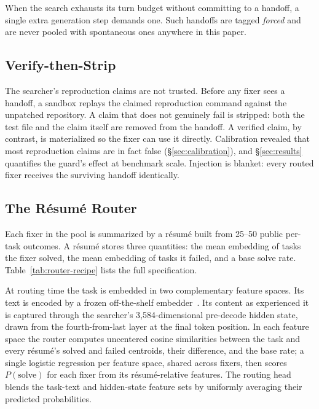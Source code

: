 When the search exhausts its turn budget without committing to a handoff, a
single extra generation step demands one.  Such handoffs are tagged
\emph{forced} and are never pooled with spontaneous ones anywhere in this paper.

\subsection{Verify-then-Strip}
\label{sec:verify-strip}

The searcher's reproduction claims are not trusted.  Before any fixer sees a
handoff, a sandbox replays the claimed reproduction command against the
unpatched repository.  A claim that does not genuinely fail is stripped: both
the test file and the claim itself are removed from the handoff.  A verified
claim, by contrast, is materialized so the fixer can use it directly.
Calibration revealed that most reproduction claims are in fact false
(\S\ref{sec:calibration}), and \S\ref{sec:results} quantifies the guard's
effect at benchmark scale.  Injection is blanket: every routed fixer receives
the surviving handoff identically.

\subsection{The R\'esum\'e Router}
\label{sec:router}

\begin{table}[!tbp]
\centering
\caption{\textbf{The r\'esum\'e router, end to end.}  Each fixer's
r\'esum\'e stores two embedding centroids and a base rate, computed from
public per-task outcomes.  A logistic head per feature space scores
$P(\text{solve})$; the router walks the pool in cheap-first order,
stopping at the first fixer clearing~$\theta$.  Adding a new fixer
requires only 25--50 public outcomes and no retraining.}
\label{tab:router-recipe}

\end{table}

Each fixer in the pool is summarized by a r\'esum\'e built from 25--50 public
per-task outcomes.  A r\'esum\'e stores three quantities: the mean embedding of
tasks the fixer solved, the mean embedding of tasks it failed, and a base solve
rate.  Table~\ref{tab:router-recipe} lists the full specification.

At routing time the task is embedded in two complementary feature spaces.  Its
text is encoded by a frozen off-the-shelf embedder~\citep{qwen3embedding}.  Its
content as \modelname experienced it is captured through the searcher's
3{,}584-dimensional pre-decode hidden state, drawn from the fourth-from-last
layer at the final token position.  In each feature space the router computes
uncentered cosine similarities between the task and every r\'esum\'e's solved
and failed centroids, their difference, and the base rate; a single logistic
regression per feature space, shared across fixers, then scores
$P(\text{solve})$ for each fixer from its r\'esum\'e-relative features.  The
routing head blends the
task-text and hidden-state feature sets by uniformly averaging their predicted
probabilities.

